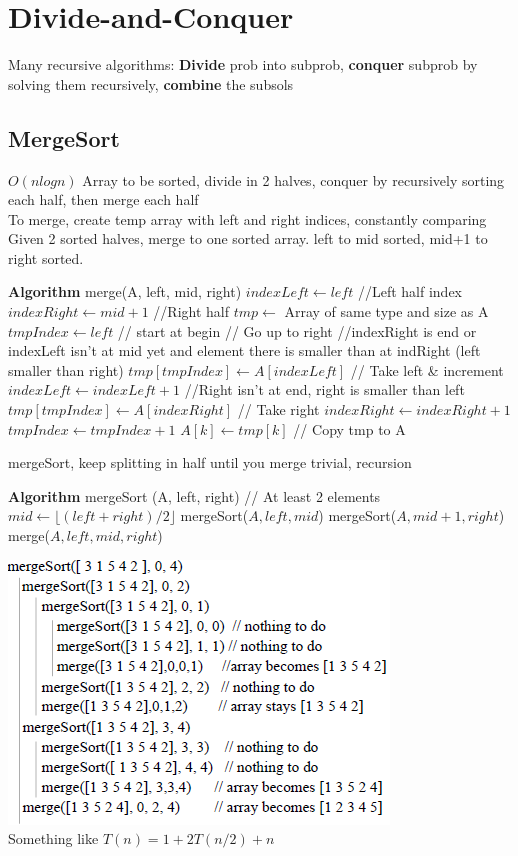 \section{\textcolor{CarnationPink}{Divide-and-Conquer}} Many recursive algorithms: 
\textbf{Divide} prob into subprob, \textbf{conquer} subprob by solving them recursively, \textbf{combine} the subsols
\subsection{MergeSort}$O(n log n)$ Array to be sorted, divide in 2 halves, conquer by recursively sorting each half, then merge each half
\\ To merge, create temp array with left and right indices, constantly comparing
\\ Given 2 sorted halves, merge to one sorted array. left to mid sorted, mid+1 to right sorted.
\begin{algorithmic}
\State \textbf{Algorithm} merge(A, left, mid, right)
\State $indexLeft \gets left$ //Left half index
\State $indexRight \gets mid+1$ //Right half
\State $tmp \gets $ Array of same type and size as A
\State $tmpIndex \gets left$ // start at begin
 // Go up to right
	 //indexRight is end or indexLeft isn't at mid yet and element there is smaller than at indRight (left smaller than right)
		\State $tmp[tmpIndex] \gets A[indexLeft]$ // Take left \& increment
		\State $indexLeft \gets indexLeft+1$
	\Else //Right isn't at end, right is smaller than left
		\State $tmp[tmpIndex]\gets A[indexRight]$ // Take right
		\State $indexRight \gets indexRight+1$
	\EndIf
	\State $tmpIndex \gets tmpIndex+1$
\EndWhile
{} $A[k] \gets tmp[k]$ // Copy tmp to A
\EndFor
\end{algorithmic}
mergeSort, keep splitting in half until you merge trivial, recursion
\begin{algorithmic}
	\State \textbf{Algorithm} mergeSort (A, left, right)
	 // At least 2 elements
		\State $mid \gets \lfloor (left+right)/2 \rfloor $
		\State mergeSort($A,left,mid$)
		\State mergeSort($A,mid+1, right$)
		\State merge($A,left,mid,right$)
	\EndIf
\end{algorithmic}
\includegraphics[scale=0.4]{ms}\\
Something like $T(n)=1+2T(n/2)+n$
